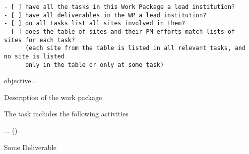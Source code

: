 \begin{draft}
\begin{verbatim}
- [ ] have all the tasks in this Work Package a lead institution?
- [ ] have all deliverables in the WP a lead institution?
- [ ] do all tasks list all sites involved in them?
- [ ] does the table of sites and their PM efforts match lists of sites for each task?
      (each site from the table is listed in all relevant tasks, and no site is listed
      only in the table or only at some task)
\end{verbatim}
\end{draft}

\begin{workpackage}[id=ecosystem,wphases=0-48,swsites,
  title=Developing the Jupyter Ecosystem,short=Ecosystem,
  lead=SRL,
  SRLRM=16,
  UPSUDRM=4,
  XFELRM=4,
]
\begin{wpobjectives}
 \begin{compactitem}
   \item objective...
 \end{compactitem}
\end{wpobjectives}

\begin{wpdescription}

Description of the work package
\end{wpdescription}

\begin{tasklist}
\begin{task}[title=Task title,
  id=task-id,lead=UPSUD,PM=1,wphases={0-48!.2},
  partners={SRL,UPSUD,XFEL}]
  The task includes the following activities
  \begin{compactitem}
  \item ...
    ()
  \end{compactitem}
\end{task}
\end{tasklist}


\begin{wpdelivs}
\begin{wpdeliv}[due=1,miles=startup,id=infrastructure,dissem=PU,nature=DEC,lead=SRL]
  {Some Deliverable}
\end{wpdeliv}

\end{wpdelivs}
\end{workpackage}

